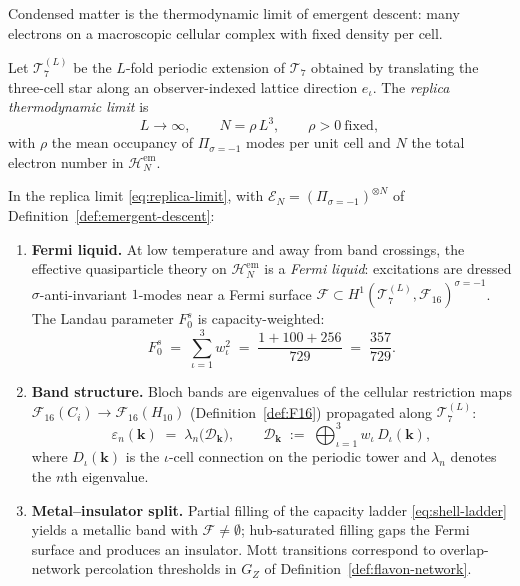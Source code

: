 Condensed matter is the thermodynamic limit of emergent descent: many
electrons on a macroscopic cellular complex with fixed density per cell.

\begin{definition}\label{def:replica-limit}
Let $\mathcal{T}_7^{(L)}$ be the $L$-fold periodic extension of
$\mathcal{T}_7$ obtained by translating the three-cell star along an
observer-indexed lattice direction $e_\iota$. The \emph{replica
thermodynamic limit} is
\begin{equation}\label{eq:replica-limit}
  L\to\infty,
  \qquad
  N=\rho\,L^3,
  \qquad
  \rho>0\ \text{fixed},
\end{equation}
with $\rho$ the mean occupancy of $\Pi_{\sigma=-1}$ modes per unit cell and
$N$ the total electron number in $\mathcal{H}_N^{\mathrm{em}}$.
\end{definition}

\begin{theorem}
\label{thm:condensed-matter}
In the replica limit \eqref{eq:replica-limit}, with
$\mathcal{E}_N=(\Pi_{\sigma=-1})^{\otimes N}$ of
Definition~\ref{def:emergent-descent}:
\begin{enumerate}[label=(\roman*),leftmargin=*]
  \item \textbf{Fermi liquid.} At low temperature and away from band
    crossings, the effective quasiparticle theory on
    $\mathcal{H}_N^{\mathrm{em}}$ is a \emph{Fermi liquid}: excitations are
    dressed $\sigma$-anti-invariant $1$-modes near a Fermi surface
    $\mathcal{F}\subset H^1(\mathcal{T}_7^{(L)},\mathcal{F}_{16})^{\sigma=-1}$.
    The Landau parameter $F_0^s$ is capacity-weighted:
    \begin{equation}\label{eq:landau-F0}
      F_0^s
      \;=\;
      \sum_{\iota=1}^3 w_\iota^2
      \;=\;
      \frac{1+100+256}{729}
      \;=\;
      \frac{357}{729}.
    \end{equation}
  \item \textbf{Band structure.} Bloch bands are eigenvalues of the cellular
    restriction maps $\mathcal{F}_{16}(C_i)\to\mathcal{F}_{16}(H_{10})$
    (Definition~\ref{def:F16}) propagated along $\mathcal{T}_7^{(L)}$:
    \begin{equation}\label{eq:bloch-bands}
      \varepsilon_n(\mathbf{k})
      \;=\;
      \lambda_n\!\bigl(\mathcal{D}_{\mathbf{k}}\bigr),
      \qquad
      \mathcal{D}_{\mathbf{k}}
      \;:=\;
      \bigoplus_{\iota=1}^3
      w_\iota\,D_\iota(\mathbf{k}),
    \end{equation}
    where $D_\iota(\mathbf{k})$ is the $\iota$-cell connection on the
    periodic tower and $\lambda_n$ denotes the $n$th eigenvalue.
  \item \textbf{Metal--insulator split.} Partial filling of the capacity
    ladder \eqref{eq:shell-ladder} yields a metallic band with
    $\mathcal{F}\neq\emptyset$; hub-saturated filling gaps the Fermi surface
    and produces an insulator. Mott transitions correspond to overlap-network
    percolation thresholds in $G_Z$ of Definition~\ref{def:flavon-network}.
\end{enumerate}
\end{theorem}

